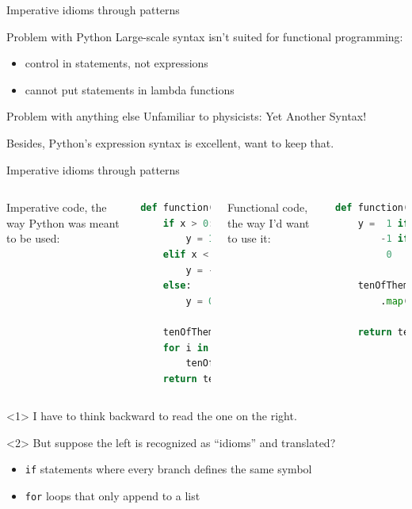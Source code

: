 \documentclass{beamer}
\begin{document}
\begin{frame}{Imperative idioms through patterns}
\begin{block}{Problem with Python}
Large-scale syntax isn't suited for functional programming:
\begin{itemize}
\item control in statements, not expressions
\item cannot put statements in lambda functions
\end{itemize}
\end{block}

\vspace{0.25 cm}
\begin{block}{Problem with anything else}
Unfamiliar to physicists: Yet Another Syntax!

\vspace{0.3 cm}
Besides, Python's expression syntax is excellent, want to keep that.
\end{block}
\end{frame}

\begin{frame}[fragile]{Imperative idioms through patterns}
\vfill
\begin{columns}
Imperative code, the way Python was meant to be used:

\begin{lstlisting}[language=python, basicstyle=\ttfamily\scriptsize]
def function(x: (-inf, inf)):
    if x > 0:
        y = 1
    elif x < 0:
        y = -1
    else:
        y = 0

    tenOfThem = []
    for i in range(10):
        tenOfThem.append(y)
    return tenOfThem
\end{lstlisting}

Functional code, the way I'd want to use it:

\begin{lstlisting}[language=python, basicstyle=\ttfamily\scriptsize]
def function(x: (-inf, inf)):
    y =  1 if x > 0 else
        -1 if x < 0 else
         0

    tenOfThem = range(10) \
        .map(lambda i: y)

    return tenOfThem



\end{lstlisting}
\end{columns}

\vfill
\begin{onlyenv}<1>
I have to think backward to read the one on the right.
\end{onlyenv}
\begin{onlyenv}<2>
But suppose the left is recognized as ``idioms'' and translated?
\begin{itemize}
\item {\tt \small if} statements where every branch defines the same symbol
\item {\tt \small for} loops that only append to a list
\end{itemize}
\end{onlyenv}
\end{frame}
\end{document}
